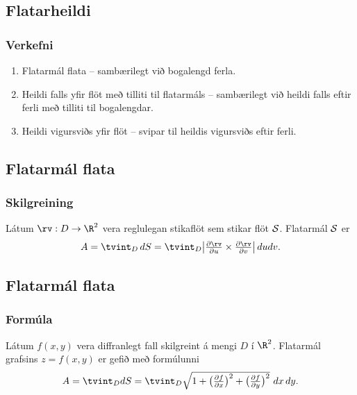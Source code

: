 \subsection{Flatarheildi} 

\subsubsection{Verkefni  \rtask{}}
\begin {enumerate}
 \item Flatarmál flata -- sambærilegt við bogalengd ferla.  
\item Heildi falls yfir flöt með tilliti til flatarmáls -- sambærilegt við heildi falls eftir ferli með tilliti til bogalengdar.
\item Heildi vigursviðs yfir flöt -- svipar til heildis vigursviðs eftir ferli. 
 \end {enumerate}









\subsection{Flatarmál flata} 

\subsubsection{Skilgreining  \rtask{}}
  Látum $\rv:D\rightarrow \R^2$ vera
reglulegan stikaflöt sem stikar flöt $\cal S$.  Flatarmál $\cal S$ er  
$$ A=\tvint_D\,dS=\tvint_D \big|{\textstyle\frac{\partial \rv}{\partial u}
\times\frac{\partial \rv}{\partial v}}\big|\,dudv.$$





\subsection{Flatarmál flata} 

\subsubsection{Formúla  \rtask{}}
Látum $f(x,y)$ vera diffranlegt fall skilgreint á
mengi $D$ í $\R^2$.  Flatarmál grafsins $z=f(x,y)$ er gefið með
formúlunni 
$$A=\tvint_D dS=\tvint_D {\textstyle\sqrt{1+
\big(\frac{\partial f}{\partial x}\big)^2+
\big(\frac{\partial f}{\partial y}\big)^2}}\,\,dx\,dy.$$
   




